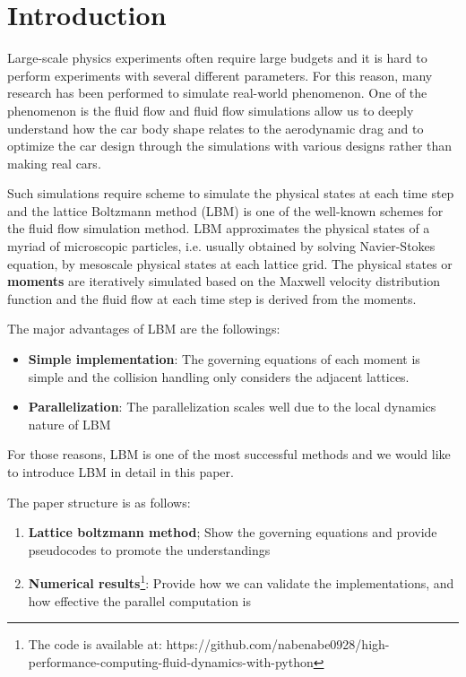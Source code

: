 \chapter{Introduction}
\vspace{-5mm}
Large-scale physics experiments often require large budgets
and it is hard to perform experiments with several different parameters.
For this reason, many research has been performed to simulate real-world 
phenomenon.
One of the phenomenon is the fluid flow
and fluid flow simulations allow us to deeply understand
how the car body shape relates to the aerodynamic drag
and to optimize the car design through the simulations with
various designs rather than making real cars\cite{}.

Such simulations require scheme to simulate the physical states
at each time step
and the lattice Boltzmann method (LBM) \cite{} is one of the well-known
schemes for the fluid flow simulation method.
LBM approximates the physical states of a myriad of microscopic particles,
i.e. usually obtained by solving Navier-Stokes equation,
by mesoscale physical states at each lattice grid.
The physical states or {\bf moments} are iteratively simulated based on
the Maxwell velocity distribution function\cite{} and
the fluid flow at each time step is derived from the moments.

The major advantages of LBM are the followings:
\begin{itemize}
  \item {\bf Simple implementation}: The governing equations of each moment
  is simple and the collision handling only considers the adjacent lattices. 
  \item {\bf Parallelization}: The parallelization scales well due to
  the local dynamics nature of LBM\cite{}
\end{itemize}
For those reasons, LBM is one of the most successful methods and
we would like to introduce LBM in detail in this paper.

The paper structure is as follows:
\begin{enumerate}
  \item {\bf Lattice boltzmann method}; Show the governing equations and 
  provide pseudocodes to promote the understandings
  \item {\bf Numerical results}\footnote{
  The code is available at:
    https://github.com/nabenabe0928/high-performance-computing-fluid-dynamics-with-python
  }: Provide how we can validate the implementations,
  and how effective the parallel computation is
\end{enumerate}
